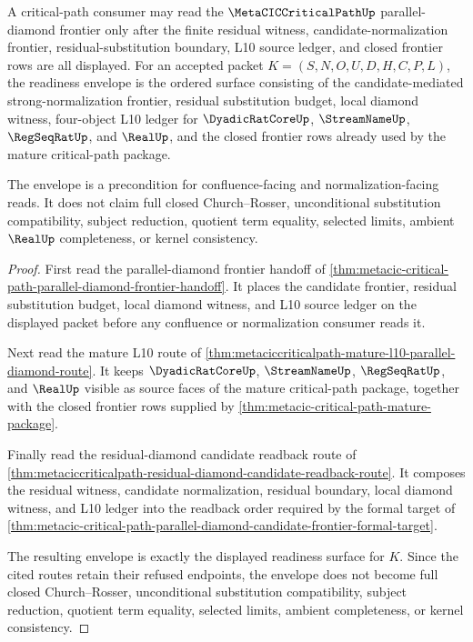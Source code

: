 \begin{theorem}
\label{thm:metacic-parallel-diamond-frontier-readiness-envelope}
A critical-path consumer may read the $\MetaCICCriticalPathUp$ parallel-diamond frontier only after the finite residual witness, candidate-normalization frontier, residual-substitution boundary, L10 source ledger, and closed frontier rows are all displayed. For an accepted packet $K=(S,N,O,U,D,H,C,P,L)$, the readiness envelope is the ordered surface consisting of the candidate-mediated strong-normalization frontier, residual substitution budget, local diamond witness, four-object L10 ledger for $\DyadicRatCoreUp$, $\StreamNameUp$, $\RegSeqRatUp$, and $\RealUp$, and the closed frontier rows already used by the mature critical-path package.

The envelope is a precondition for confluence-facing and normalization-facing reads. It does not claim full closed Church--Rosser, unconditional substitution compatibility, subject reduction, quotient term equality, selected limits, ambient $\RealUp$ completeness, or kernel consistency.
\end{theorem}
\begin{proof}
First read the parallel-diamond frontier handoff of \autoref{thm:metacic-critical-path-parallel-diamond-frontier-handoff}. It places the candidate frontier, residual substitution budget, local diamond witness, and L10 source ledger on the displayed packet before any confluence or normalization consumer reads it.

Next read the mature L10 route of \autoref{thm:metaciccriticalpath-mature-l10-parallel-diamond-route}. It keeps $\DyadicRatCoreUp$, $\StreamNameUp$, $\RegSeqRatUp$, and $\RealUp$ visible as source faces of the mature critical-path package, together with the closed frontier rows supplied by \autoref{thm:metacic-critical-path-mature-package}.

Finally read the residual-diamond candidate readback route of \autoref{thm:metaciccriticalpath-residual-diamond-candidate-readback-route}. It composes the residual witness, candidate normalization, residual boundary, local diamond witness, and L10 ledger into the readback order required by the formal target of \autoref{thm:metacic-critical-path-parallel-diamond-candidate-frontier-formal-target}.

The resulting envelope is exactly the displayed readiness surface for $K$. Since the cited routes retain their refused endpoints, the envelope does not become full closed Church--Rosser, unconditional substitution compatibility, subject reduction, quotient term equality, selected limits, ambient completeness, or kernel consistency.
\end{proof}

